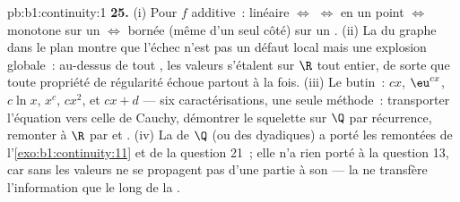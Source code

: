 \begin{solution}{pb:b1:continuity:1}
\textbf{25.} (i) Pour $f$ additive~: linéaire $\iff$ 
$\iff$  en un point $\iff$ monotone sur un 
$\iff$ bornée (même d'un seul côté) sur un . (ii) La 
du graphe dans le plan montre que l'échec n'est pas un défaut local
mais une explosion globale~: au-dessus de tout , les
valeurs s'étalent sur $\R$ tout entier, de sorte que toute propriété de
régularité échoue partout à la fois. (iii) Le butin~: $cx$, $\eu^{cx}$,
$c\ln x$, $x^c$, $cx^2$, et $cx + d$ --- six caractérisations,
une seule méthode~: transporter l'équation vers celle de Cauchy,
démontrer le squelette sur $\Q$ par récurrence, remonter à $\R$ par
 et . (iv) La  de $\Q$ (ou des dyadiques) a
porté les remontées de l'\cref{exo:b1:continuity:11} et de la question
21~; elle n'a rien porté à la question 13, car sans  les
valeurs ne se propagent pas d'une partie  à son  ---
la  ne transfère l'information que le long de la .
\end{solution}
